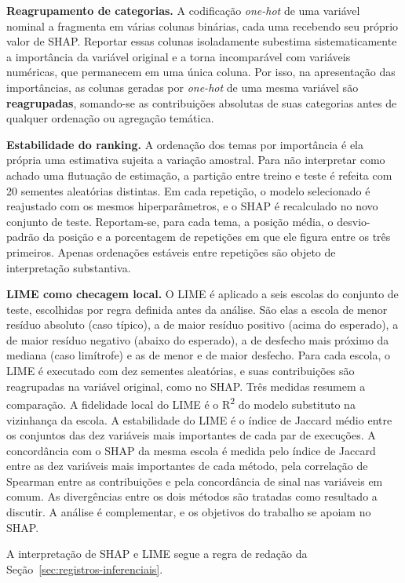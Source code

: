 \textbf{Reagrupamento de categorias.} A codificação \textit{one-hot} de uma
variável nominal a fragmenta em várias colunas binárias, cada uma recebendo
seu próprio valor de SHAP. Reportar essas colunas isoladamente subestima
sistematicamente a importância da variável original e a torna incomparável
com variáveis numéricas, que permanecem em uma única coluna. Por isso, na
apresentação das importâncias, as colunas geradas por \textit{one-hot} de
uma mesma variável são \textbf{reagrupadas}, somando-se as contribuições
absolutas de suas categorias antes de qualquer ordenação ou agregação
temática.

\textbf{Estabilidade do ranking.} A ordenação dos temas por importância é
ela própria uma estimativa sujeita a variação amostral. Para não
interpretar como achado uma flutuação de estimação, a partição entre treino
e teste é refeita com 20 sementes aleatórias distintas. Em cada repetição,
o modelo selecionado é reajustado com os mesmos hiperparâmetros, e o SHAP é
recalculado no novo conjunto de teste. Reportam-se, para cada tema, a
posição média, o desvio-padrão da posição e a porcentagem de repetições em
que ele figura entre os três primeiros. Apenas ordenações estáveis entre
repetições são objeto de interpretação substantiva.

\textbf{LIME como checagem local.} O LIME \cite{ribeiro2016lime} é
aplicado a seis escolas do conjunto de teste, escolhidas por regra definida
antes da análise. São elas a escola de menor resíduo absoluto (caso
típico), a de maior resíduo positivo (acima do esperado), a de maior
resíduo negativo (abaixo do esperado), a de desfecho mais próximo da
mediana (caso limítrofe) e as de menor e de maior desfecho. Para cada
escola, o LIME é executado com dez sementes aleatórias, e suas
contribuições são reagrupadas na variável original, como no SHAP. Três
medidas resumem a comparação. A fidelidade local do LIME é o
R\textsuperscript{2} do modelo substituto na vizinhança da escola. A
estabilidade do LIME é o índice de Jaccard médio entre os conjuntos das dez
variáveis mais importantes de cada par de execuções. A concordância com o
SHAP da mesma escola é medida pelo índice de Jaccard entre as dez variáveis
mais importantes de cada método, pela correlação de Spearman entre as
contribuições e pela concordância de sinal nas variáveis em comum. As
divergências entre os dois métodos são tratadas como resultado a discutir.
A análise é complementar, e os objetivos do trabalho se apoiam no SHAP.

A interpretação de SHAP e LIME segue a regra de redação da
Seção~\ref{sec:registros-inferenciais}.

